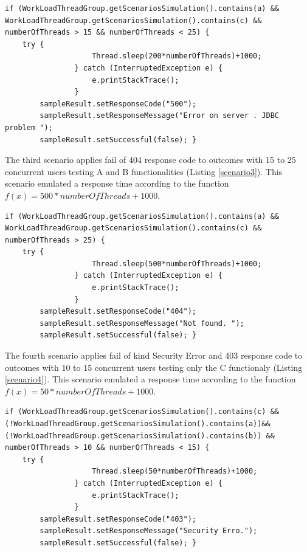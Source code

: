 \documentclass[review]{elsarticle}
\begin{document}
\begin{lstlisting}[style=outline,caption={Emulated Scenario 2},label=scenario2]
if (WorkLoadThreadGroup.getScenariosSimulation().contains(a) && WorkLoadThreadGroup.getScenariosSimulation().contains(c) && numberOfThreads > 15 && numberOfThreads < 25) {
    try {
					Thread.sleep(200*numberOfThreads)+1000;
				} catch (InterruptedException e) {
					e.printStackTrace();	
				}
        sampleResult.setResponseCode("500");
        sampleResult.setResponseMessage("Error on server . JDBC problem ");
        sampleResult.setSuccessful(false); }
\end{lstlisting}

The third scenario applies fail of 404 response code to  outcomes  with 15 to 25 concurrent users testing A and B functionalities (Listing \ref{scenario3}).  This scenario emulated a response time according to the function $f(x)=500*numberOfThreads+1000$. 

\begin{lstlisting}[style=outline,caption={Emulated Scenario 3},label=scenario3]
if (WorkLoadThreadGroup.getScenariosSimulation().contains(a) && WorkLoadThreadGroup.getScenariosSimulation().contains(c) && numberOfThreads > 25) {
    try {
					Thread.sleep(500*numberOfThreads)+1000;
				} catch (InterruptedException e) {
					e.printStackTrace();	
				}
        sampleResult.setResponseCode("404");
        sampleResult.setResponseMessage("Not found. ");
        sampleResult.setSuccessful(false); }
\end{lstlisting}

The fourth scenario applies fail of kind Security Error and 403 response code to  outcomes  with 10 to 15 concurrent users testing only the C functionaly (Listing \ref{scenario4}).  This scenario emulated a response time according to the function $f(x)=50*numberOfThreads+1000$. 

\begin{lstlisting}[style=outline,caption={Emulated Scenario 4},label=scenario4]
if (WorkLoadThreadGroup.getScenariosSimulation().contains(c) && (!WorkLoadThreadGroup.getScenariosSimulation().contains(a))&& (!WorkLoadThreadGroup.getScenariosSimulation().contains(b)) && numberOfThreads > 10 && numberOfThreads < 15) {
    try {
					Thread.sleep(50*numberOfThreads)+1000;
				} catch (InterruptedException e) {
					e.printStackTrace();	
				}
        sampleResult.setResponseCode("403");
        sampleResult.setResponseMessage("Security Erro.");
        sampleResult.setSuccessful(false); }
\end{lstlisting}
\end{document}
